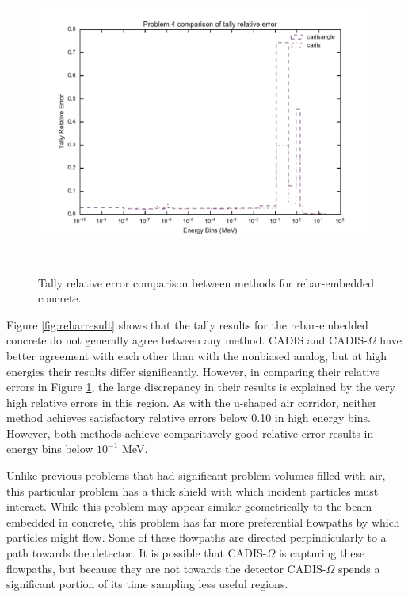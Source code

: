 \begin{figure}[h!]
  \centering
  \includegraphics[height=10cm]{./chapters/characterization_probs/figures/char/prob_4/problem_4_tally_error_compare.pdf}
  \caption[Tally relative error comparison between methods for rebar-embedded concrete.]
  {Tally relative error comparison between methods for rebar-embedded concrete.}
  \label{fig:rebarerror}
\end{figure}

Figure \ref{fig:rebarresult} shows that the tally results for the rebar-embedded
concrete do not generally agree between any method. CADIS and CADIS-$\Omega$
have better agreement with each other than with the nonbiased analog, but at
high energies their results differ significantly. However, in comparing their
relative errors in Figure \ref{fig:rebarerror}, the large discrepancy in their
results is explained by the very high relative errors in this region. As with
the u-shaped air corridor, neither method achieves satisfactory relative errors
below 0.10 in high energy bins. However, both methods achieve comparitavely good
relative error results in energy bins below $10^{-1}$ MeV.

Unlike previous problems that had
significant problem volumes filled with air, this particular problem has a thick
shield with which incident particles must interact. While this problem may
appear similar geometrically to the beam embedded in
concrete, this problem has far more preferential flowpaths by which particles
might flow. Some of these flowpaths are directed perpindicularly to a path
towards the detector. It is possible that CADIS-$\Omega$ is capturing these
flowpaths, but because they are not towards the detector CADIS-$\Omega$ spends a
significant portion of its time sampling less useful regions.

